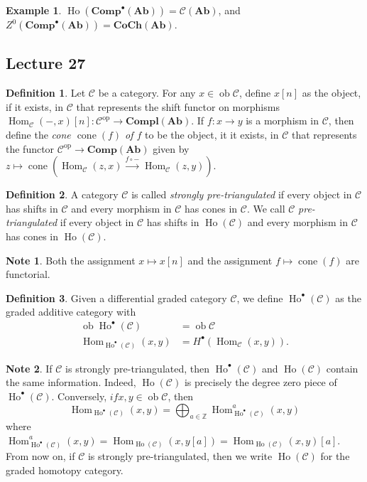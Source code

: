 \documentclass[10pt,letterpaper,cm]{nupset}
\theoremstyle{definition}
\newtheorem*{definition}{Definition}
\newtheorem{exmp}{Example}
\newtheorem{note}{Note}
\newcommand{\Z}{\mathbb Z}
\newcommand{\1}{\mathbf{1}}
\renewcommand{\c}{\mathscr{C}}
\newcommand{\0}{\vec 0}
\DeclareMathOperator{\op}{op}
\DeclareMathOperator{\ob}{ob}
\DeclareMathOperator{\Hom}{Hom}
\DeclareMathOperator{\cone}{cone}
\DeclareMathOperator{\ho}{Ho}
\begin{document}
\begin{exmp}
$\ho(\mathbf{Comp}^{\bullet}(\mathbf{Ab})) = \mathcal{C}(\mathbf{Ab})$, and $Z^0(\mathbf{Comp}^{\bullet}(\mathbf{Ab})) = \mathbf{CoCh}(\mathbf{Ab})$.
\end{exmp}


\subsection{Lecture 27}

\begin{definition}
Let $\c$ be a category. For any $x\in \ob{\c}$, define $x[n]$ as the object, if it exists, in $\c$ that represents the shift functor on morphisms $\Hom_{\c}({-}, x)[n] :\c^{\op}\to \mathbf{Compl}(\mathbf{Ab})$. If $f : x\to y$ is a morphism in $\c$, then define the \textit{cone $\cone(f)$ of $f$} to be the object, it it exists, in $\c$ that represents the functor $\c^{\op} \to \mathbf{Comp}(\mathbf{Ab})$ given by $z \mapsto \cone(\Hom_{\c}(z,x) \overset{f \circ {-}}{\longrightarrow} \Hom_{\c}(z,y))$.  
\end{definition}

\begin{definition}
A category $\c$ is called \textit{strongly pre-triangulated} if every object in $\c$ has shifts in $\c$ and every morphism in $\c$ has cones in $\c$. We call $\c$ \textit{pre-triangulated} if every object in $\c$ has shifts in $\ho(\c)$ and every morphism in $\c$ has cones in $\ho(\c)$.
\end{definition}

\begin{note}
Both the assignment $x \mapsto x[n]$ and the assignment $f \mapsto \cone(f)$ are functorial. 
\end{note}

\begin{definition}
Given a differential graded category $\c$, we define $\ho^{\bullet}(\c)$ as the graded additive category with 
\begin{align*}
\ob{\ho^{\bullet}(\c)} & = \ob{\c}
\\ \Hom_{\ho^{\bullet}(\c)}(x,y) &= H^{\bullet}(\Hom_{\c}(x,y))
.\end{align*}
\end{definition}

\begin{note}
If $\c$ is strongly pre-triangulated, then $\ho^{\bullet}(\c)$ and $\ho(\c)$ contain the same information. Indeed, $\ho(\c)$ is precisely the degree zero piece of $\ho^{\bullet}(\c)$. Conversely, $if x,y \in \ob{\c}$, then $$\Hom_{\ho^{\bullet}(\c)}(x,y) = \bigoplus_{a\in \Z}\Hom^a_{\ho^{\bullet}(\c)}(x,y)$$ where $\Hom_{\ho^{\bullet}(\c)}^a(x,y)  =  \Hom_{\ho(\c)}(x, y[a]) = \Hom_{\ho(\c)}(x,y)[a]$. From now on, if $\c$ is strongly pre-triangulated, then we write $\ho(\c)$ for the graded homotopy category. 
\end{note}
\end{document}
